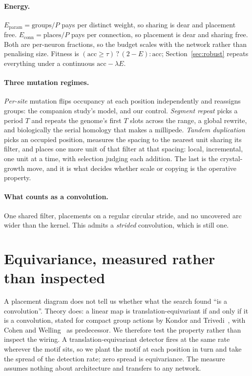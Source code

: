 \documentclass[11pt]{article}
\begin{document}
\paragraph{Energy.} $E_{\text{param}} = \text{groups}/P$ pays per distinct weight, so sharing is dear and
placement free. $E_{\text{conn}} = \text{places}/P$ pays per connection, so placement is dear and sharing
free. Both are per-neuron fractions, so the budget scales with the network rather than penalising size.
Fitness is $(\text{acc} \geq \tau)\,?\,(2 - E) : \text{acc}$; Section~\ref{sec:robust} repeats everything
under a continuous $\text{acc} - \lambda E$.

\paragraph{Three mutation regimes.} \emph{Per-site} mutation flips occupancy at each position
independently and reassigns groups: the companion study's model, and our control. \emph{Segment repeat}
picks a period $T$ and repeats the genome's first $T$ slots across the range, a global rewrite, and
biologically the serial homology that makes a millipede. \emph{Tandem duplication} picks an occupied
position, measures the spacing to the nearest unit sharing its filter, and places one more unit of that
filter at that spacing: local, incremental, one unit at a time, with selection judging each addition.
The last is the crystal-growth move, and it is what decides whether scale or copying is the operative
property.

\paragraph{What counts as a convolution.} One shared filter, placements on a regular circular stride, and
no uncovered arc wider than the kernel. This admits a \emph{strided} convolution, which is still one.

\section{Equivariance, measured rather than inspected}\label{sec:equiv}

A placement diagram does not tell us whether what the search found ``is a convolution''. Theory does: a
linear map is translation-equivariant if and only if it is a convolution, stated for compact group
actions by Kondor and Trivedi~\cite{kondor}, with Cohen and Welling~\cite{cohenwelling} as predecessor.
We therefore test the property rather than inspect the wiring. A translation-equivariant detector fires
at the same rate wherever the motif sits, so we plant the motif at each position in turn and take the
spread of the detection rate; zero spread is equivariance. The measure assumes nothing about
architecture and transfers to any network.
\end{document}
